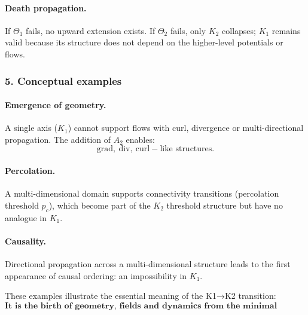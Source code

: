 \paragraph{Death propagation.}
If $\Theta_1$ fails, no upward extension exists.
If $\Theta_2$ fails, only $K_2$ collapses; $K_1$ remains valid because
its structure does not depend on the higher-level potentials or flows.

\subsubsection{5. Conceptual examples}

\paragraph{Emergence of geometry.}
A single axis ($K_1$) cannot support flows with curl, divergence or
multi-directional propagation. The addition of $A_2$ enables:
\[
\mathrm{grad},\ \mathrm{div},\ \mathrm{curl}-\text{like structures}.
\]

\paragraph{Percolation.}
A multi-dimensional domain supports connectivity transitions
(percolation threshold $p_c$), which become part of the $K_2$ threshold
structure but have no analogue in $K_1$.

\paragraph{Causality.}
Directional propagation across a multi-dimensional structure leads to
the first appearance of causal ordering: an impossibility in $K_1$.

These examples illustrate the essential meaning of the K1→K2 transition:
\[
\textbf{It is the birth of geometry, fields and dynamics from the minimal
representational continuum.}
\]
